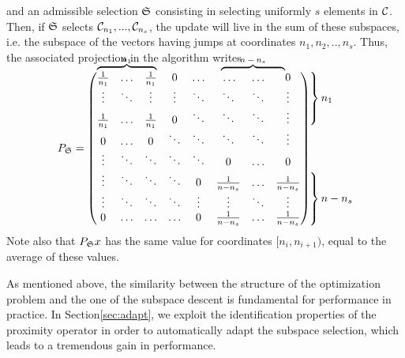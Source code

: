 and an admissible selection $\mathfrak{S}$ consisting in selecting uniformly $s$ elements in $\mathcal{C}$. {
Then, if $\mathfrak{S}$ selects $\mathcal{C}_{n_1},...,\mathcal{C}_{n_s}$, the update will live in the sum of these subspaces, i.e. the subspace of the vectors having jumps at coordinates $n_1,n_2,..,n_s$. Thus, the associated projection in the algorithm writes\\[2ex]
{\footnotesize 
\begin{equation}\label{eq:proj_tv}
P_{\Sel} =
\begin{matrix}
\begin{pmatrix}
\overmat{$n_1$}{\frac{1}{n_1}& \hdots & \frac{1}{n_1}}& 0 &\hdots & \overmat{$n-n_s$}{\hdots &\hdots & \hspace*{4pt}0\hspace*{4pt}} \\
\vdots& \ddots & \vdots & \vdots & \ddots & \ddots &\ddots & \vdots\\
\frac{1}{n_1}& \hdots & \frac{1}{n_1}& 0 &\ddots & \ddots &\ddots & \vdots\\
0 & \hdots & 0  &\ddots & \ddots & \ddots & \ddots & \vdots\\
\vdots & \ddots & \ddots & \ddots  &\ddots & 0  & \hdots & 0\\
\vdots &\ddots & \ddots &\ddots & 0 & \frac{1}{n-n_s}& \hdots & \frac{1}{n-n_s}\\
\vdots & \ddots & \ddots &\ddots & \vdots & \vdots& \ddots & \vdots\\
0 &\hdots & \hdots &\hdots & 0 & \frac{1}{n-n_s}& \hdots & \frac{1}{n-n_s}
\end{pmatrix}
\hspace*{-5pt}
\begin{aligned}
  &\left.\begin{matrix}
  \\[36pt]
  \end{matrix} \right\} %
  n_1\\[40pt]
  &\left.\begin{matrix}
  \\[36pt]
  \end{matrix} \right\} %
  n-n_s
\end{aligned}
\end{matrix}
\end{equation}}}
Note also that $P_{\mathfrak{S}}x$ has the same value for coordinates $[n_i,n_{i+1})$, equal to the average of these values.

As mentioned above, the similarity between the structure of the optimization problem and the one of the subspace descent is fundamental for performance in practice. In Section\;\ref{sec:adapt}, we exploit the identification properties of the proximity operator in order to automatically adapt the subspace selection, which leads to a tremendous gain in performance.

